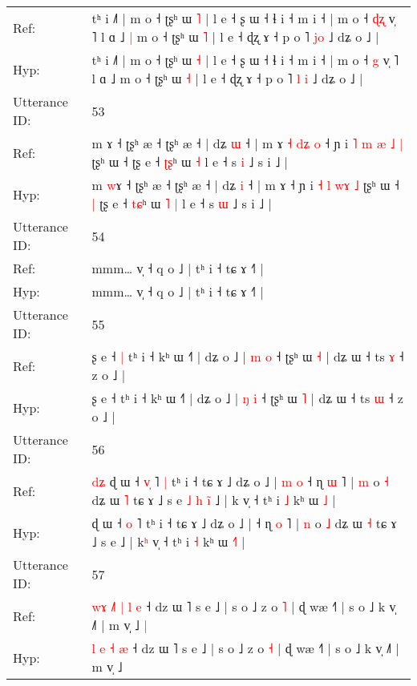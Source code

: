 \documentclass[10pt]{article}
\DeclareRobustCommand{\hl}[1]{{\textcolor{red}{#1}}}
\begin{document}
\begin{longtable}{ll}
Ref: & tʰ i ˩˥ | m o ˧ ʈʂʰ ɯ \hl{˥} | l e ˧ ʂ ɯ ˧ ɬ i ˧ m i ˧ | m o ˧ \hl{ɖ}\hl{ʐ} v̩ ˥ l ɑ ˩\hl{ }\hl{|} m o ˧ ʈʂʰ ɯ \hl{˥} | l e ˧ ɖʐ ɤ ˧ p o ˥ \hl{}\hl{j}\hl{o} ˩ dʑ o ˩ |
 \\
Hyp: & tʰ i ˩˥ | m o ˧ ʈʂʰ ɯ \hl{˧} | l e ˧ ʂ ɯ ˧ ɬ i ˧ m i ˧ | m o ˧ \hl{}\hl{g} v̩ ˥ l ɑ ˩\hl{}\hl{} m o ˧ ʈʂʰ ɯ \hl{˧} | l e ˧ ɖʐ ɤ ˧ p o ˥ \hl{l}\hl{ }\hl{i} ˩ dʑ o ˩ |
 \\
\midrule
Utterance ID: & 53 \\
Ref: & m \hl{}ɤ ˧ ʈʂʰ æ ˧ ʈʂʰ æ ˧ | dʑ \hl{ɯ} ˧ | m ɤ\hl{ }\hl{˧}\hl{ }\hl{d}\hl{ʑ}\hl{ }\hl{o} ˧ ɲ i \hl{˥} \hl{m} \hl{æ}\hl{ }\hl{˩} \hl{|} ʈʂʰ ɯ ˧\hl{}\hl{} ʈʂ e ˧ \hl{ʈ}\hl{ʂ}ʰ ɯ\hl{}\hl{} \hl{˧} l e ˧ s \hl{i} ˩ s i ˩ |
 \\
Hyp: & m \hl{w}ɤ ˧ ʈʂʰ æ ˧ ʈʂʰ æ ˧ | dʑ \hl{i} ˧ | m ɤ\hl{}\hl{}\hl{}\hl{}\hl{}\hl{}\hl{} ˧ ɲ i \hl{˧} \hl{l} \hl{}\hl{w}\hl{ɤ} \hl{˩} ʈʂʰ ɯ ˧\hl{ }\hl{|} ʈʂ e ˧ \hl{t}\hl{ɕ}ʰ ɯ\hl{ }\hl{˥} \hl{|} l e ˧ s \hl{ɯ} ˩ s i ˩ |
 \\
\midrule
Utterance ID: & 54 \\
Ref: & mmm… v̩ ˧ q o ˩ | tʰ i ˧ tɕ ɤ ˧˥ |
 \\
Hyp: & mmm… v̩ ˧ q o ˩ | tʰ i ˧ tɕ ɤ ˧˥ |
 \\
\midrule
Utterance ID: & 55 \\
Ref: & ʂ e ˧\hl{ }\hl{|} tʰ i ˧ kʰ ɯ ˧˥ | dʑ o ˩ | \hl{m} \hl{o} ˧ ʈʂʰ ɯ \hl{˧} | dʑ ɯ ˧ ts \hl{ɤ} ˧ z o ˩ |
 \\
Hyp: & ʂ e ˧\hl{}\hl{} tʰ i ˧ kʰ ɯ ˧˥ | dʑ o ˩ | \hl{ŋ} \hl{i} ˧ ʈʂʰ ɯ \hl{˥} | dʑ ɯ ˧ ts \hl{ɯ} ˧ z o ˩ |
 \\
\midrule
Utterance ID: & 56 \\
Ref: & \hl{d}\hl{ʑ}\hl{ }ɖ ɯ ˧ \hl{v}\hl{̩} ˥\hl{ }\hl{|} tʰ i ˧ tɕ ɤ ˩ dʑ o ˩ |\hl{ }\hl{m}\hl{ }\hl{o} ˧ ɳ \hl{ɯ} ˥ | \hl{m} o \hl{˧} dʑ ɯ \hl{˥} tɕ ɤ ˩ s e\hl{ }\hl{˩}\hl{ }\hl{h}\hl{ }\hl{i}\hl{̃} ˩ | k\hl{} v̩ ˧ tʰ i \hl{˩} kʰ ɯ \hl{}\hl{˩} |
 \\
Hyp: & \hl{}\hl{}\hl{}ɖ ɯ ˧ \hl{}\hl{o} ˥\hl{}\hl{} tʰ i ˧ tɕ ɤ ˩ dʑ o ˩ |\hl{}\hl{}\hl{}\hl{} ˧ ɳ \hl{o} ˥ | \hl{n} o \hl{˩} dʑ ɯ \hl{˧} tɕ ɤ ˩ s e\hl{}\hl{}\hl{}\hl{}\hl{}\hl{}\hl{} ˩ | k\hl{ʰ} v̩ ˧ tʰ i \hl{˧} kʰ ɯ \hl{˧}\hl{˥} |
 \\
\midrule
Utterance ID: & 57 \\
Ref: & \hl{w}\hl{ɤ}\hl{ }\hl{˩}\hl{˥} \hl{|} \hl{l} \hl{e} ˧ dz ɯ ˥ s e ˩ | s o ˩ z o \hl{˥} | ɖ wæ ˧˥ | s o ˩ k v̩ ˩˥ | m v̩ ˩\hl{ }\hl{|}
 \\
Hyp: & \hl{}\hl{}\hl{}\hl{}\hl{l} \hl{e} \hl{˧} \hl{æ} ˧ dz ɯ ˥ s e ˩ | s o ˩ z o \hl{˧} | ɖ wæ ˧˥ | s o ˩ k v̩ ˩˥ | m v̩ ˩\hl{}\hl{}

\end{longtable}
\end{document}
